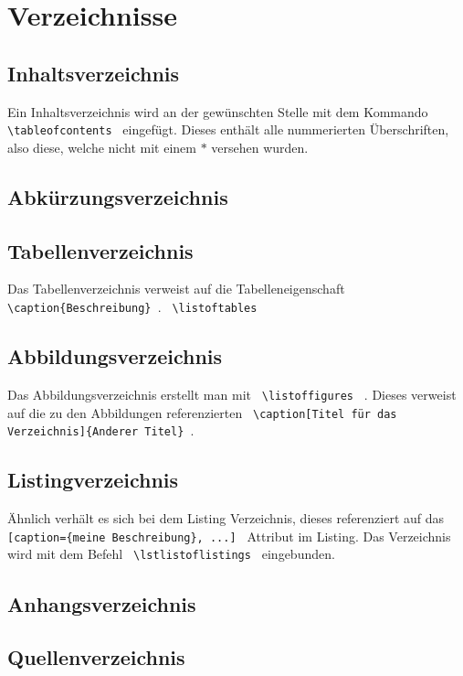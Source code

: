 \section{Verzeichnisse}
\subsection{Inhaltsverzeichnis}
Ein Inhaltsverzeichnis wird an der gewünschten Stelle mit dem Kommando 
\lstinline$ \tableofcontents $ eingefügt. Dieses enthält alle nummerierten 
Überschriften, also diese, welche nicht mit einem $*$ versehen wurden.
\subsection{Abkürzungsverzeichnis}

\subsection{Tabellenverzeichnis}
Das Tabellenverzeichnis verweist auf die Tabelleneigenschaft 
\lstinline$ \caption{Beschreibung} $.
\lstinline $ \listoftables $

\subsection{Abbildungsverzeichnis}
Das Abbildungsverzeichnis erstellt man mit \lstinline$ \listoffigures $ . 
Dieses verweist auf die zu den Abbildungen referenzierten 
\lstinline $ \caption[Titel für das Verzeichnis]{Anderer Titel} $.
\subsection{Listingverzeichnis}
Ähnlich verhält es sich bei dem Listing Verzeichnis, dieses referenziert auf 
das \lstinline $ [caption={meine Beschreibung}, ...] $ Attribut im Listing.
Das Verzeichnis wird mit dem Befehl \lstinline $ \lstlistoflistings $ 
eingebunden.
\subsection{Anhangsverzeichnis}
\subsection{Quellenverzeichnis}